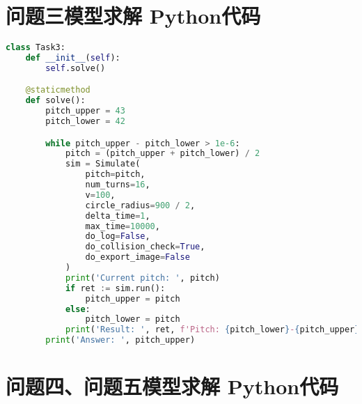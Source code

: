 \section{问题三模型求解 Python代码}

\begin{lstlisting}[language=python]
class Task3:
    def __init__(self):
        self.solve()

    @staticmethod
    def solve():
        pitch_upper = 43
        pitch_lower = 42

        while pitch_upper - pitch_lower > 1e-6:
            pitch = (pitch_upper + pitch_lower) / 2
            sim = Simulate(
                pitch=pitch,
                num_turns=16,
                v=100,
                circle_radius=900 / 2,
                delta_time=1,
                max_time=10000,
                do_log=False,
                do_collision_check=True,
                do_export_image=False
            )
            print('Current pitch: ', pitch)
            if ret := sim.run():
                pitch_upper = pitch
            else:
                pitch_lower = pitch
            print('Result: ', ret, f'Pitch: {pitch_lower}-{pitch_upper}')
        print('Answer: ', pitch_upper)
\end{lstlisting}

\section{问题四、问题五模型求解 Python代码}

